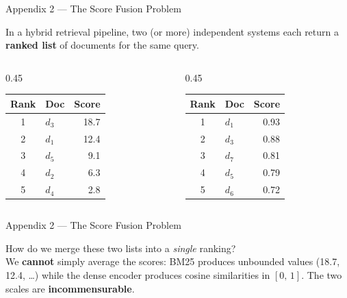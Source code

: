 \documentclass[aspectratio=169]{beamer}
\begin{document}
\begin{frame}{Appendix 2 --- The Score Fusion Problem}

In a hybrid retrieval pipeline, two (or more) independent systems
each return a \textbf{ranked list} of documents for the same query.

\bigskip

\begin{columns}[T]
\begin{column}{0.45\textwidth}
\begin{tcolorbox}[colback=blue!5!white, colframe=blue!75!black,
  title=\textbf{BM25 (sparse)}]
\renewcommand{\arraystretch}{1.15}
\begin{tabular}{c l r}
Rank & Doc & Score \\
\hline
1 & $d_3$ & 18.7 \\
2 & $d_1$ & 12.4 \\
3 & $d_5$ & 9.1 \\
4 & $d_2$ & 6.3 \\
5 & $d_4$ & 2.8 \\
\end{tabular}
\end{tcolorbox}
\end{column}

\begin{column}{0.45\textwidth}
\begin{tcolorbox}[colback=red!5!white, colframe=red!70!black,
  title=\textbf{Dense encoder}]
\renewcommand{\arraystretch}{1.15}
\begin{tabular}{c l r}
Rank & Doc & Score \\
\hline
1 & $d_1$ & 0.93 \\
2 & $d_3$ & 0.88 \\
3 & $d_7$ & 0.81 \\
4 & $d_5$ & 0.79 \\
5 & $d_6$ & 0.72 \\
\end{tabular}
\end{tcolorbox}
\end{column}
\end{columns}
\end{frame}
%
%
\begin{frame}{Appendix 2 --- The Score Fusion Problem}

\begin{tcolorbox}[colback=orange!5!white, colframe=orange!70!black,
  title=\textbf{The problem}]
How do we merge these two lists into a \emph{single} ranking?\\[4pt]
We \textbf{cannot} simply average the scores:
BM25 produces unbounded values (18.7, 12.4, \ldots)
while the dense encoder produces cosine similarities in $[0,\,1]$.
The two scales are \textbf{incommensurable}.
\end{tcolorbox}

\end{frame}
\end{document}
